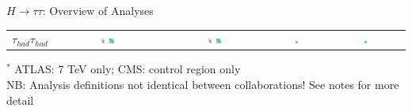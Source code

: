 \documentclass{beamer}
\begin{document}
\begin{frame}{$H \rightarrow \tau \tau$: Overview of Analyses}
\begin{table}
\begin{tabular}{c | c | c | c | c | c | c}
			
			\hline
			$\tau_{had} \tau_{had}$ &
			\includegraphics[width=0.05\textwidth]{figures/atlas_logo.pdf} \includegraphics[width=0.05\textwidth]{figures/cms_logo.pdf} &
			\includegraphics[width=0.05\textwidth]{figures/atlas_logo.pdf} \includegraphics[width=0.05\textwidth]{figures/cms_logo.pdf} &	
			\includegraphics[width=0.05\textwidth]{figures/cms_logo.pdf}&
			&\includegraphics[width=0.05\textwidth]{figures/cms_logo.pdf} 
			&  
			\\					
				
		\end{tabular}
	\end{table}
	\scriptsize
	$^*$ ATLAS: 7 TeV only; CMS: control region only \\
	NB: Analysis definitions not identical between collaborations!  See notes for more detail
\end{frame}
\end{document}
